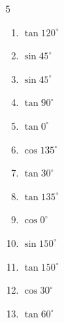 \begin{multicols}{5}
\begin{enumerate}
  \item $\displaystyle \tan{120^\circ}$


  \item $\displaystyle \sin{45^\circ}$


  \item $\displaystyle \sin{45^\circ}$


  \item $\displaystyle \tan{90^\circ}$

        \phantom{$\displaystyle なし$}

  \item $\displaystyle \tan{0^\circ}$

        \phantom{$\displaystyle =0$}

  \item $\displaystyle \cos{135^\circ}$


  \item $\displaystyle \tan{30^\circ}$


  \item $\displaystyle \tan{135^\circ}$

        \phantom{$\displaystyle =-1$}

  \item $\displaystyle \cos{0^\circ}$

        \phantom{$\displaystyle =1$}

  \item $\displaystyle \sin{150^\circ}$


\columnbreak %

  \item $\displaystyle \tan{150^\circ}$


  \item $\displaystyle \cos{30^\circ}$


  \item $\displaystyle \tan{60^\circ}$


\end{enumerate}
\end{multicols}
